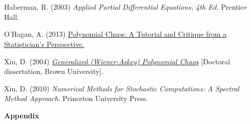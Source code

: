\documentclass[11pt]{article}
\numberwithin{equation}{section}
\begin{document}
\

\




\begin{thebibliography}{9}

 Haberman, R. (2003) {\em Applied Partial Differential Equations, 4th Ed.} Prentice Hall.

 O'Hagan, A. (2013) \href{http://tonyohagan.co.uk/academic/pdf/Polynomial-chaos.pdf}{Polynomial Chaos: A Tutorial and Critique from a Statistician's Perspective.}


 Xiu, D. (2004) \href{https://www.brown.edu/research/projects/crunch/sites/brown.edu.research.projects.crunch/files/uploads/Dongbin\%20Xiu\%20Thesis.pdf}{\em Generalized (Wiener-Askey) Polynomial Chaos} [Doctoral dissertation, Brown University].

 Xiu, D. (2010) {\em Numerical Methods for Stochastic Computations: A Spectral Method Approach}. Princeton University Press.

\end{thebibliography}




\pagebreak 

\textbf{Appendix} \label{app:hermite2d}
\end{document}

